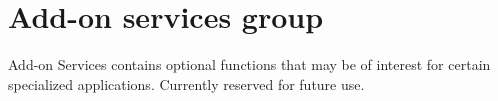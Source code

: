 \hypertarget{a00680}{
\section{Add-\/on services group}
\label{a00680}
}
Add-\/on Services contains optional functions that may be of interest for certain specialized applications. Currently reserved for future use. 